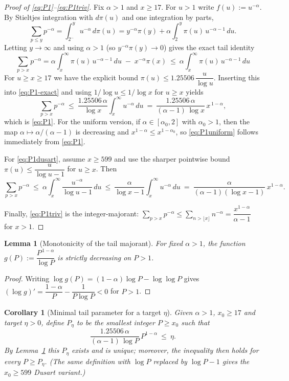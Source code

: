 \documentclass[11pt]{article}
\newtheorem{lemma}[theorem]{Lemma}
\newtheorem{corollary}[theorem]{Corollary}
\theoremstyle{definition}
\theoremstyle{remark}
\begin{document}
\begin{proof}[Proof of \eqref{eq:P1}--\eqref{eq:P1triv}]
Fix $\alpha>1$ and $x\ge 17$. For $u>1$ write $f(u):=u^{-\alpha}$. By Stieltjes integration with $d\pi(u)$ and one integration by parts,
\[
\sum_{p\le y} p^{-\alpha}
=\int_{2^-}^{y} u^{-\alpha}\,d\pi(u)
= y^{-\alpha}\pi(y)+\alpha\!\int_{2}^{y} \pi(u)\,u^{-\alpha-1}\,du.
\]
Letting $y\to\infty$ and using $\alpha>1$ (so $y^{-\alpha}\pi(y)\to 0$) gives the exact tail identity
\begin{equation}\label{eq:P1-exact}
\sum_{p>x} p^{-\alpha}
=\alpha\!\int_{x}^{\infty}\!\pi(u)\,u^{-\alpha-1}\,du\;-\;x^{-\alpha}\pi(x)
\ \le\ \alpha\!\int_{x}^{\infty}\!\pi(u)\,u^{-\alpha-1}\,du
\end{equation}
For $u\ge x\ge 17$ we have the explicit bound $\pi(u)\le 1.25506\,\dfrac{u}{\log u}$. Inserting this into \eqref{eq:P1-exact} and using $1/\log u\le 1/\log x$ for $u\ge x$ yields
\[
\sum_{p>x} p^{-\alpha}
\ \le\ \frac{1.25506\,\alpha}{\log x}\!\int_{x}^{\infty}\!u^{-\alpha}\,du
\ =\ \frac{1.25506\,\alpha}{(\alpha-1)\,\log x}\,x^{\,1-\alpha},
\]
which is \eqref{eq:P1}. For the uniform version, if $\alpha\in[\alpha_0,2]$ with $\alpha_0>1$, then the map $\alpha\mapsto \alpha/(\alpha-1)$ is decreasing and $x^{1-\alpha}\le x^{1-\alpha_0}$, so \eqref{eq:P1uniform} follows immediately from \eqref{eq:P1}.

For \eqref{eq:P1dusart}, assume $x\ge 599$ and use the sharper pointwise bound $\pi(u)\le \dfrac{u}{\log u-1}$ for $u\ge x$. Then
\[
\sum_{p>x} p^{-\alpha}
\ \le\ \alpha\!\int_{x}^{\infty}\!\frac{u^{-\alpha}}{\log u-1}\,du
\ \le\ \frac{\alpha}{\log x-1}\!\int_{x}^{\infty}\!u^{-\alpha}\,du
\ =\ \frac{\alpha}{(\alpha-1)(\log x-1)}\,x^{1-\alpha}.
\]

Finally, \eqref{eq:P1triv} is the integer-majorant: $\sum_{p>x}p^{-\alpha}\le \sum_{n>\lfloor x\rfloor}n^{-\alpha}=\dfrac{x^{1-\alpha}}{\alpha-1}$ for $x>1$.
\end{proof}

\begin{lemma}[Monotonicity of the tail majorant]\label{lem:P1-monotone}
For fixed $\alpha>1$, the function $g(P):=\dfrac{P^{\,1-\alpha}}{\log P}$ is strictly decreasing on $P>1$.
\end{lemma}
\begin{proof}
Writing $\log g(P)=(1-\alpha)\log P-\log\log P$ gives
$(\log g)'=\dfrac{1-\alpha}{P}-\dfrac{1}{P\log P}<0$ for $P>1$.
\end{proof}

\begin{corollary}[Minimal tail parameter for a target $\eta$]\label{cor:P1-minP}
Given $\alpha>1$, $x_0\ge 17$ and target $\eta>0$, define $P_\eta$ to be the smallest integer $P\ge x_0$ such that
\[
\frac{1.25506\,\alpha}{(\alpha-1)\,\log P}\,P^{1-\alpha}\ \le\ \eta.
\]
By Lemma~\ref{lem:P1-monotone} this $P_\eta$ exists and is unique; moreover, the inequality then holds for every $P\ge P_\eta$. (The same definition with $\log P$ replaced by $\log P-1$ gives the $x_0\ge 599$ Dusart variant.)
\end{corollary}
\end{document}
